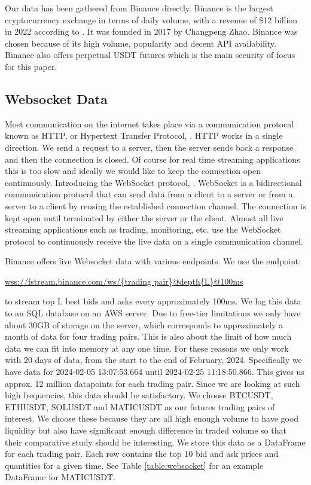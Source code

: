 Our data has been gathered from Binance directly.
Binance is the largest cryptocurrency exchange in terms of daily volume, with a revenue of \$12 billion in 2022 according to \cite{TULLY2023}. 
It was founded in 2017 by Changpeng Zhao. %
Binance was chosen because of its high volume, popularity and decent API availability.
Binance also offers perpetual USDT futures which is the main security of focus for this paper.

\subsection{Websocket Data}
Most communication on the internet takes place via a communication protocal known as HTTP, or 
Hypertext Transfer Protocol, \cite{HTTP1999}.
HTTP works in a single direction. We send a request to a server, then the server sends back a response
and then the connection is closed.
Of course for real time streaming applications this is too slow and ideally we would like to keep
the connection open continuously. Introducing the WebSocket protocol, \cite{WEBSOCKET2011}.
WebSocket is a bidirectional communication protocol that can send data from a client to a server
or from a server to a client by reusing the established connection channel.
The connection is kept open until terminated by either the server or the client.
Almost all live streaming applications such as trading, monitoring, etc. use the
WebSocket protocol to continuously receive the live data on a single communication channel.

Binance offers live Websocket data with various endpoints. 
We use the endpoint: 

\url{wss://fstream.binance.com/ws/{trading pair}@depth{L}@100ms}

to stream top L best bids and asks every approximately 100ms.
We log this data to an SQL database on an AWS server.
Due to free-tier limitations we only have about 30GB of storage on the server,
which corresponds to approximately a month of data for four trading pairs. 
This is also about the limit of how much data we can fit into memory at any one time. For these reasons
we only work with 20 days of data, from the start to the end of February, 2024. Specifically
we have data for 2024-02-05 13:07:53.664 until 2024-02-25 11:18:50.866.
This gives us approx. 12 million datapoints for each trading pair.
Since we are looking at such high frequencies, this data should be satisfactory.
We choose BTCUSDT, ETHUSDT, SOLUSDT and MATICUSDT as our futures trading pairs of interest. We choose
these because they are all high enough volume to have good liquidity but also have significant
enough difference in traded volume so that their comparative study should be interesting.
We store this data as a DataFrame for each trading pair. Each row contains the top 10 bid and ask prices and quantities
for a given time. See Table \ref{table:websocket} for an example DataFrame for MATICUSDT. 

